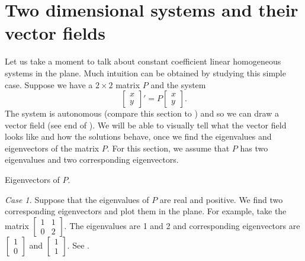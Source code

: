 \documentclass[12pt]{book}
\begin{document}

\sectionnewpage
\section{Two dimensional systems and their vector fields}
\label{sec:twodimaut}


Let us take a moment to talk about constant coefficient linear
homogeneous systems in the plane.
Much intuition can be obtained by studying this simple case.
Suppose we have a $2 \times 2$ matrix $P$ and the system
\begin{equation} \label{pln:eq}
\begin{bmatrix} x \\ y \end{bmatrix} ' =
P \begin{bmatrix} x \\ y \end{bmatrix} .
\end{equation}
The system is autonomous (compare this section
to )
and so we can draw a vector field (see end of
).
We will be able to visually tell what the vector field looks like and
how the solutions behave, once we find 
the eigenvalues and eigenvectors of the matrix $P$.
For this section,
we assume that $P$ has two eigenvalues and two corresponding
eigenvectors.

\medskip

\begin{diffyfloatingfigurepdfonly}{3.1in}
\capstart
\begin{center}
\caption{Eigenvectors of $P$.\label{pln:source-eigfig}}
\end{center}
\end{diffyfloatingfigurepdfonly}


\emph{Case 1.}  Suppose that the eigenvalues of $P$ are real and positive.
We find two corresponding eigenvectors and plot them in the plane.  For
example, take the
matrix $\left[ \begin{smallmatrix} 1 & 1 \\ 0 & 2 \end{smallmatrix}
\right]$.
The eigenvalues are 1 and 2 and corresponding eigenvectors are
$\left[ \begin{smallmatrix} 1 \\ 0 \end{smallmatrix} \right]$ and
$\left[ \begin{smallmatrix} 1 \\ 1 \end{smallmatrix} \right]$.  See
.
\end{document}

